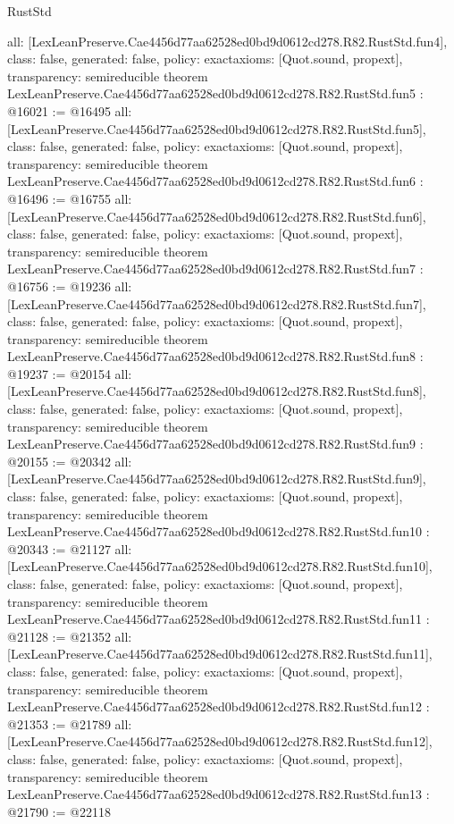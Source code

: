 \begin{lexlean}{RustStd}
\begin{coremodule}
{  all: [LexLeanPreserve.Cae4456d77aa62528ed0bd9d0612cd278.R82.RustStd.fun4],
  class: false,
  generated: false,
  policy: exact{axioms: [Quot.sound, propext]},
  transparency: semireducible
}
theorem LexLeanPreserve.Cae4456d77aa62528ed0bd9d0612cd278.R82.RustStd.fun5 : @16021 := @16495 {
  all: [LexLeanPreserve.Cae4456d77aa62528ed0bd9d0612cd278.R82.RustStd.fun5],
  class: false,
  generated: false,
  policy: exact{axioms: [Quot.sound, propext]},
  transparency: semireducible
}
theorem LexLeanPreserve.Cae4456d77aa62528ed0bd9d0612cd278.R82.RustStd.fun6 : @16496 := @16755 {
  all: [LexLeanPreserve.Cae4456d77aa62528ed0bd9d0612cd278.R82.RustStd.fun6],
  class: false,
  generated: false,
  policy: exact{axioms: [Quot.sound, propext]},
  transparency: semireducible
}
theorem LexLeanPreserve.Cae4456d77aa62528ed0bd9d0612cd278.R82.RustStd.fun7 : @16756 := @19236 {
  all: [LexLeanPreserve.Cae4456d77aa62528ed0bd9d0612cd278.R82.RustStd.fun7],
  class: false,
  generated: false,
  policy: exact{axioms: [Quot.sound, propext]},
  transparency: semireducible
}
theorem LexLeanPreserve.Cae4456d77aa62528ed0bd9d0612cd278.R82.RustStd.fun8 : @19237 := @20154 {
  all: [LexLeanPreserve.Cae4456d77aa62528ed0bd9d0612cd278.R82.RustStd.fun8],
  class: false,
  generated: false,
  policy: exact{axioms: [Quot.sound, propext]},
  transparency: semireducible
}
theorem LexLeanPreserve.Cae4456d77aa62528ed0bd9d0612cd278.R82.RustStd.fun9 : @20155 := @20342 {
  all: [LexLeanPreserve.Cae4456d77aa62528ed0bd9d0612cd278.R82.RustStd.fun9],
  class: false,
  generated: false,
  policy: exact{axioms: [Quot.sound, propext]},
  transparency: semireducible
}
theorem LexLeanPreserve.Cae4456d77aa62528ed0bd9d0612cd278.R82.RustStd.fun10 : @20343 := @21127 {
  all: [LexLeanPreserve.Cae4456d77aa62528ed0bd9d0612cd278.R82.RustStd.fun10],
  class: false,
  generated: false,
  policy: exact{axioms: [Quot.sound, propext]},
  transparency: semireducible
}
theorem LexLeanPreserve.Cae4456d77aa62528ed0bd9d0612cd278.R82.RustStd.fun11 : @21128 := @21352 {
  all: [LexLeanPreserve.Cae4456d77aa62528ed0bd9d0612cd278.R82.RustStd.fun11],
  class: false,
  generated: false,
  policy: exact{axioms: [Quot.sound, propext]},
  transparency: semireducible
}
theorem LexLeanPreserve.Cae4456d77aa62528ed0bd9d0612cd278.R82.RustStd.fun12 : @21353 := @21789 {
  all: [LexLeanPreserve.Cae4456d77aa62528ed0bd9d0612cd278.R82.RustStd.fun12],
  class: false,
  generated: false,
  policy: exact{axioms: [Quot.sound, propext]},
  transparency: semireducible
}
theorem LexLeanPreserve.Cae4456d77aa62528ed0bd9d0612cd278.R82.RustStd.fun13 : @21790 := @22118 {
}
\end{coremodule}
\end{lexlean}
